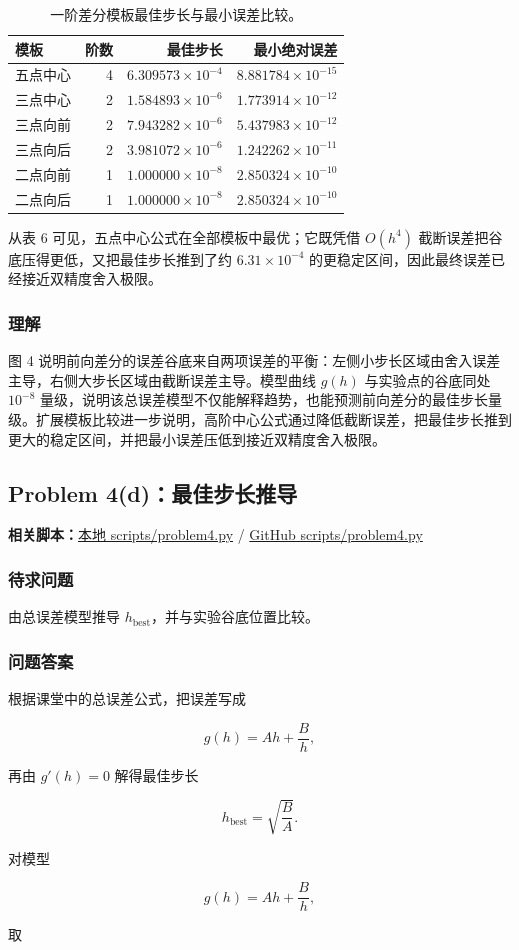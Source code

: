 \documentclass[12pt,a4paper,fontset=none]{ctexart}
\newcommand{\problem}[1]{\subsection{#1}}
\newcommand{\blocktitle}[1]{\subsubsection{#1}}
\newcommand{\scriptpath}[1]{{#1}}
\newcommand{\githubscriptsbase}{https://github.com/Void0312Aurora/computational-physics-homework-2026/blob/main/06/scripts}
\newcommand{\scriptlink}[1]{\noindent\textbf{相关脚本：}\href{../../../scripts/#1}{\scriptpath{本地 scripts/#1}} / \href{\githubscriptsbase/#1}{\scriptpath{GitHub scripts/#1}}\par\medskip}
\begin{document}
\begin{table}[H]
  \centering
  \caption{一阶差分模板最佳步长与最小误差比较。}
  \footnotesize
  \begin{tabular}{lrrr}
    \toprule
    模板 & 阶数 & 最佳步长 & 最小绝对误差 \\
    \midrule
    五点中心 & 4 & \(6.309573\times 10^{-4}\) & \(8.881784\times 10^{-15}\) \\
    三点中心 & 2 & \(1.584893\times 10^{-6}\) & \(1.773914\times 10^{-12}\) \\
    三点向前 & 2 & \(7.943282\times 10^{-6}\) & \(5.437983\times 10^{-12}\) \\
    三点向后 & 2 & \(3.981072\times 10^{-6}\) & \(1.242262\times 10^{-11}\) \\
    二点向前 & 1 & \(1.000000\times 10^{-8}\) & \(2.850324\times 10^{-10}\) \\
    二点向后 & 1 & \(1.000000\times 10^{-8}\) & \(2.850324\times 10^{-10}\) \\
    \bottomrule
  \end{tabular}
\end{table}

从表 6 可见，五点中心公式在全部模板中最优；它既凭借 \(O(h^4)\) 截断误差把谷底压得更低，又把最佳步长推到了约 \(6.31\times 10^{-4}\) 的更稳定区间，因此最终误差已经接近双精度舍入极限。

\blocktitle{理解}

图 4 说明前向差分的误差谷底来自两项误差的平衡：左侧小步长区域由舍入误差主导，右侧大步长区域由截断误差主导。模型曲线 \(g(h)\) 与实验点的谷底同处 \(10^{-8}\) 量级，说明该总误差模型不仅能解释趋势，也能预测前向差分的最佳步长量级。扩展模板比较进一步说明，高阶中心公式通过降低截断误差，把最佳步长推到更大的稳定区间，并把最小误差压低到接近双精度舍入极限。

\problem{Problem 4(d)：最佳步长推导}

\scriptlink{problem4.py}

\blocktitle{待求问题}
由总误差模型推导 \(h_{\text{best}}\)，并与实验谷底位置比较。

\blocktitle{问题答案}
根据课堂中的总误差公式，把误差写成

\[
g(h)=Ah+\frac{B}{h},
\]

再由 \(g'(h)=0\) 解得最佳步长

\[
h_{\text{best}}=\sqrt{\frac{B}{A}}.
\]

对模型

\[
g(h)=Ah+\frac{B}{h},
\]

取
\end{document}
